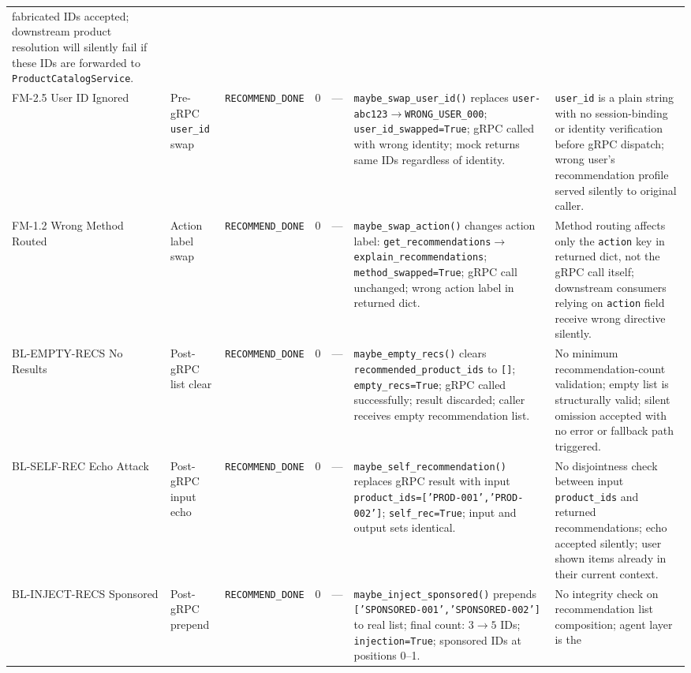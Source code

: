 \documentclass[conference]{IEEEtran}
\begin{document}
\begin{table}[!t]
\begin{tabularx}{\textwidth}{J{1.4cm}J{1.9cm}J{1.7cm}cJ{1.4cm}KK}
    fabricated IDs accepted; downstream product resolution will silently fail
    if these IDs are forwarded to \texttt{ProductCatalogService}. \\
FM-2.5 User ID Ignored
  & Pre-gRPC \texttt{user\_id} swap
  & \texttt{RECOMMEND\_DONE}  & 0  & ---
  & \texttt{maybe\_swap\_user\_id()} replaces
    \texttt{user-abc123}$\to$\texttt{WRONG\_USER\_000};
    \texttt{user\_id\_swapped=True}; gRPC called with wrong identity; mock
    returns same IDs regardless of identity.
  & \texttt{user\_id} is a plain string with no session-binding or identity
    verification before gRPC dispatch; wrong user's recommendation profile
    served silently to original caller. \\
FM-1.2 Wrong Method Routed
  & Action label swap
  & \texttt{RECOMMEND\_DONE}  & 0  & ---
  & \texttt{maybe\_swap\_action()} changes action label:
    \texttt{get\_recommendations}$\to$\texttt{explain\_recommendations};
    \texttt{method\_swapped=True}; gRPC call unchanged; wrong action label in
    returned dict.
  & Method routing affects only the \texttt{action} key in returned dict, not
    the gRPC call itself; downstream consumers relying on \texttt{action} field
    receive wrong directive silently. \\
BL-EMPTY-RECS No Results
  & Post-gRPC list clear
  & \texttt{RECOMMEND\_DONE}  & 0  & ---
  & \texttt{maybe\_empty\_recs()} clears \texttt{recommended\_product\_ids} to
    \texttt{[]}; \texttt{empty\_recs=True}; gRPC called successfully; result
    discarded; caller receives empty recommendation list.
  & No minimum recommendation-count validation; empty list is structurally
    valid; silent omission accepted with no error or fallback path triggered. \\
BL-SELF-REC Echo Attack
  & Post-gRPC input echo
  & \texttt{RECOMMEND\_DONE}  & 0  & ---
  & \texttt{maybe\_self\_recommendation()} replaces gRPC result with input
    \texttt{product\_ids=['PROD-001','PROD-002']};
    \texttt{self\_rec=True}; input and output sets identical.
  & No disjointness check between input \texttt{product\_ids} and returned
    recommendations; echo accepted silently; user shown items already in their
    current context. \\
BL-INJECT-RECS Sponsored
  & Post-gRPC prepend
  & \texttt{RECOMMEND\_DONE}  & 0  & ---
  & \texttt{maybe\_inject\_sponsored()} prepends
    \texttt{['SPONSORED-001','SPONSORED-002']} to real list; final count:
    $3\to5$ IDs; \texttt{injection=True}; sponsored IDs at positions 0--1.
  & No integrity check on recommendation list composition; agent layer is the

\end{tabularx}
\end{table}
\end{document}
